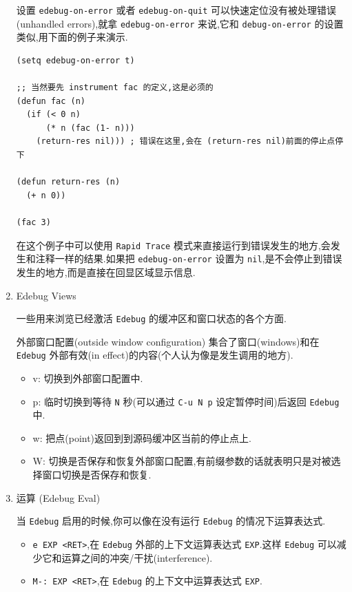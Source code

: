 \documentclass[11pt]{article}
\begin{document}
\begin{enumerate}
设置 \texttt{edebug-on-error} 或者 \texttt{edebug-on-quit} 可以快速定位没有被处理错误(unhandled errors),就拿 \texttt{edebug-on-error} 来说,它和 \texttt{debug-on-error} 的设置类似,用下面的例子来演示.

\begin{verbatim}
(setq edebug-on-error t)

;; 当然要先 instrument fac 的定义,这是必须的
(defun fac (n)
  (if (< 0 n)
      (* n (fac (1- n)))
    (return-res nil))) ; 错误在这里,会在 (return-res nil)前面的停止点停下

(defun return-res (n)
  (+ n 0))

(fac 3)
\end{verbatim}

在这个例子中可以使用 \texttt{Rapid Trace} 模式来直接运行到错误发生的地方,会发生和注释一样的结果.如果把 \texttt{edebug-on-error} 设置为 \texttt{nil},是不会停止到错误发生的地方,而是直接在回显区域显示信息.


\item Edebug Views
\label{sec:org914f5c8}

一些用来浏览已经激活 \texttt{Edebug} 的缓冲区和窗口状态的各个方面.

外部窗口配置(outside window configuration) 集合了窗口(windows)和在 \texttt{Edebug} 外部有效(in effect)的内容(个人认为像是发生调用的地方).

\begin{itemize}
\item v: 切换到外部窗口配置中.
\item p: 临时切换到等待 \texttt{N} 秒(可以通过 \texttt{C-u N p} 设定暂停时间)后返回 \texttt{Edebug} 中.
\item w: 把点(point)返回到到源码缓冲区当前的停止点上.
\item W: 切换是否保存和恢复外部窗口配置,有前缀参数的话就表明只是对被选择窗口切换是否保存和恢复.
\end{itemize}


\item 运算 (Edebug Eval)
\label{sec:orgfc2c140}

当 \texttt{Edebug} 启用的时候,你可以像在没有运行 \texttt{Edebug} 的情况下运算表达式.

\begin{itemize}
\item \texttt{e EXP <RET>},在 \texttt{Edebug} 外部的上下文运算表达式 \texttt{EXP}.这样 \texttt{Edebug} 可以减少它和运算之间的冲突/干扰(interference).

\item \texttt{M-: EXP <RET>},在 \texttt{Edebug} 的上下文中运算表达式 \texttt{EXP}.


\end{itemize}
\end{enumerate}
\end{document}
